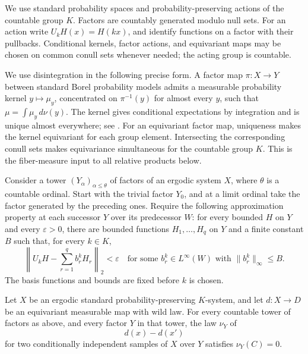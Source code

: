 We use standard probability spaces and probability-preserving actions
of the countable group $K$. Factors are countably generated modulo null
sets. For an action write $U_kH(x)=H(kx)$, and identify functions on a
factor with their pullbacks. Conditional kernels, factor actions, and
equivariant maps may be chosen on common conull sets whenever needed;
the acting group is countable.

We use disintegration in the following precise form. A factor map
$\pi:X\to Y$ between standard Borel probability models admits a
measurable probability kernel $y\mapsto\mu_y$, concentrated on
$\pi^{-1}(y)$ for almost every $y$, such that
$\mu=\int\mu_y\,d\nu(y)$. The kernel gives conditional expectations
by integration and is unique almost everywhere; see
\citet[Theorem~4 and Remark~5]{TaoDisintegration2008}.
For an equivariant factor map, uniqueness makes the kernel equivariant
for each group element. Intersecting the corresponding conull sets
makes equivariance simultaneous for the countable group $K$.
This is the fiber-measure input to all relative products below.

Consider a tower $(Y_\alpha)_{\alpha\le\theta}$ of factors of an
ergodic system $X$, where $\theta$ is a countable ordinal. Start with the
trivial factor $Y_0$, and at a limit ordinal take the factor generated
by the preceding ones. Require the following approximation property at
each successor $Y$ over its predecessor $W$: for every bounded $H$ on
$Y$ and every $\varepsilon>0$, there are bounded functions
$H_1,\ldots,H_q$ on $Y$ and a finite constant $B$ such that, for every
$k\in K$,
\begin{equation}\label{eq:source-4}
 \left\|U_kH-\sum_{r=1}^q b_r^k H_r\right\|_2<\varepsilon
 \quad\text{for some }b_r^k\in L^\infty(W)
 \text{ with }\|b_r^k\|_\infty\le B.
\end{equation}
The basis functions and bounds are fixed before $k$ is chosen.

\begin{lemma}\label{lem:relative-singularity}
Let $X$ be an ergodic standard probability-preserving $K$-system, and let
$d:X\to D$ be an equivariant measurable map with wild law. For every
countable tower of factors as above, and every factor $Y$ in that tower,
the law $\nu_Y$ of
\[
 d(x)-d(x')
\]
for two conditionally independent samples of $X$ over $Y$ satisfies
$\nu_Y(C)=0$.
\end{lemma}

